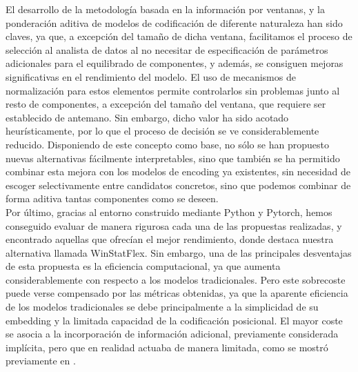 El desarrollo de la metodología basada en la información por ventanas, y la ponderación aditiva de modelos de codificación de diferente naturaleza han sido claves, ya que, a excepción del tamaño de dicha ventana, facilitamos el proceso de selección al analista de datos al no necesitar de especificación de parámetros adicionales para el equilibrado de componentes, y además, se consiguen mejoras significativas en el rendimiento del modelo. El uso de mecanismos de normalización para estos elementos permite controlarlos sin problemas junto al resto de componentes, a excepción del tamaño del ventana, que requiere ser establecido de antemano. Sin embargo, dicho valor ha sido acotado heurísticamente, por lo que el proceso de decisión se ve considerablemente reducido.
Disponiendo de este concepto como base, no sólo se han propuesto nuevas alternativas fácilmente interpretables, sino que también se ha permitido combinar esta mejora con los modelos de encoding ya existentes, sin necesidad de escoger selectivamente entre candidatos concretos, sino que podemos combinar de forma aditiva tantas componentes como se deseen.\\

Por último, gracias al entorno construido mediante Python y Pytorch, hemos conseguido evaluar de manera rigurosa cada una de las propuestas realizadas, y encontrado aquellas que ofrecían el mejor rendimiento, donde destaca nuestra alternativa llamada WinStatFlex. Sin embargo, una de las principales desventajas de esta propuesta es la eficiencia computacional, ya que aumenta considerablemente con respecto a los modelos tradicionales. Pero este sobrecoste puede verse compensado por las métricas obtenidas, ya que la aparente eficiencia de los modelos tradicionales se debe principalmente a la simplicidad de su embedding y la limitada capacidad de la codificación posicional. El mayor coste se asocia a la incorporación de información adicional, previamente considerada implícita, pero que en realidad actuaba de manera limitada, como se mostró previamente en \cite{zeng2022transformerseffectivetimeseries}.\\

